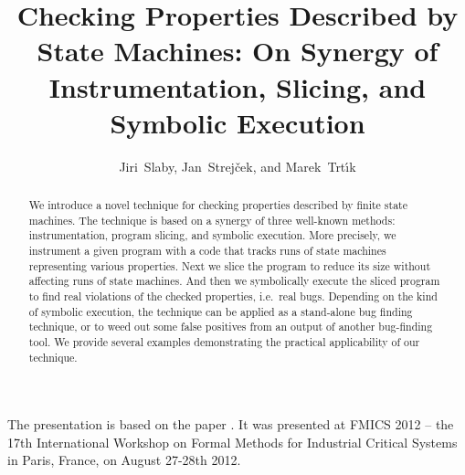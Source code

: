 \documentclass[10pt]{llncs}
\begin{document}
\title{Checking Properties Described by State Machines: On Synergy of
Instrumentation, Slicing, and Symbolic Execution}
\author{Jiri~Slaby, Jan~Strej\v{c}ek, and Marek~Trt\'{\i}k}

\maketitle

\begin{abstract}
  We introduce a novel technique for checking properties described by finite
  state machines. The technique is based on a synergy of three well-known
  methods: instrumentation, program slicing, and symbolic execution. More
  precisely, we instrument a given program with a code that tracks runs of
  state machines representing various properties. Next we slice the program to
  reduce its size without affecting runs of state machines. And then we
  symbolically execute the sliced program to find real violations of the
  checked properties, i.e.~real bugs. Depending on the kind of symbolic
  execution, the technique can be applied as a stand-alone bug finding
  technique, or to weed out some false positives from an output of another
  bug-finding tool. We provide several examples demonstrating the practical
  applicability of our technique.
\end{abstract}

  The presentation is based on the paper \cite{sse}. It was presented at FMICS
  2012 -- the 17th International Workshop on Formal Methods for Industrial
  Critical Systems in Paris, France, on August 27-28th 2012.



\end{document}
